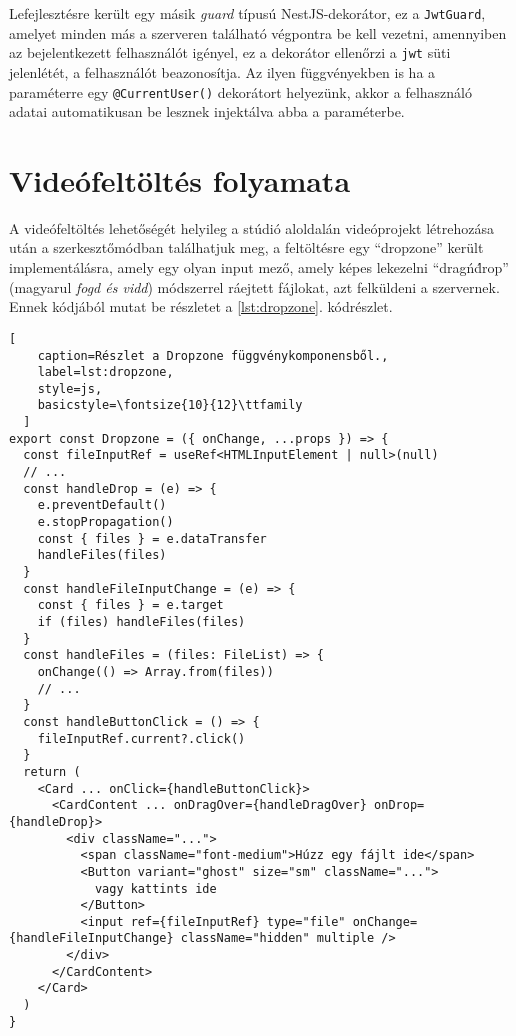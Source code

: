 Lefejlesztésre került egy másik \emph{guard} típusú NestJS-dekorátor, ez a \verb|JwtGuard|, amelyet minden más a szerveren található végpontra be kell vezetni, amennyiben az bejelentkezett felhasználót igényel, ez a dekorátor ellenőrzi a \verb|jwt| süti jelenlétét, a felhasználót beazonosítja. Az ilyen függvényekben is ha a paraméterre egy \verb|@CurrentUser()| dekorátort helyezünk, akkor a felhasználó adatai automatikusan be lesznek injektálva abba a paraméterbe.

\section{Videófeltöltés folyamata}

A videófeltöltés lehetőségét helyileg a stúdió aloldalán videóprojekt létrehozása után a szerkesztőmódban találhatjuk meg, a feltöltésre egy ``dropzone'' került implementálásra, amely egy olyan input mező, amely képes lekezelni ``drag\'n\'drop'' (magyarul \emph{fogd és vidd}) módszerrel ráejtett fájlokat, azt felküldeni a szervernek. Ennek kódjából mutat be részletet a \ref{lst:dropzone}. kódrészlet.

\begin{minipage}{0.92\textwidth}
  \begin{lstlisting}[
    caption=Részlet a Dropzone függvénykomponensből.,
    label=lst:dropzone,
    style=js,
    basicstyle=\fontsize{10}{12}\ttfamily
  ]
export const Dropzone = ({ onChange, ...props }) => {
  const fileInputRef = useRef<HTMLInputElement | null>(null)
  // ...
  const handleDrop = (e) => {
    e.preventDefault()
    e.stopPropagation()
    const { files } = e.dataTransfer
    handleFiles(files)
  }
  const handleFileInputChange = (e) => {
    const { files } = e.target
    if (files) handleFiles(files)
  }
  const handleFiles = (files: FileList) => {
    onChange(() => Array.from(files))
    // ...
  }
  const handleButtonClick = () => {
    fileInputRef.current?.click()
  }
  return (
    <Card ... onClick={handleButtonClick}>
      <CardContent ... onDragOver={handleDragOver} onDrop={handleDrop}>
        <div className="...">
          <span className="font-medium">Húzz egy fájlt ide</span>
          <Button variant="ghost" size="sm" className="...">
            vagy kattints ide
          </Button>
          <input ref={fileInputRef} type="file" onChange={handleFileInputChange} className="hidden" multiple />
        </div>
      </CardContent>
    </Card>
  )
}
\end{lstlisting}
\end{minipage}

